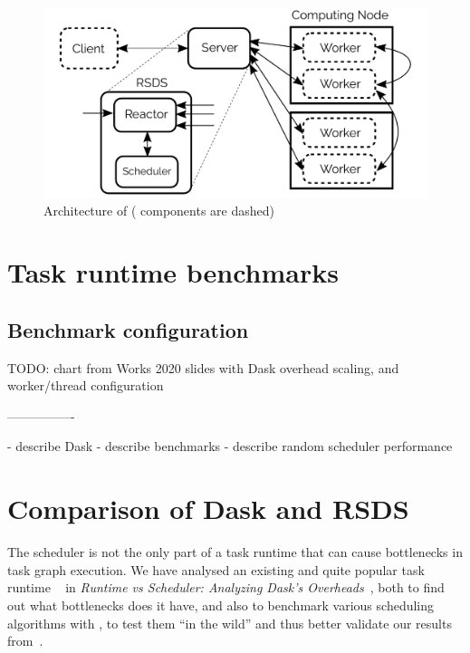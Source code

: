 \begin{figure}[tbph]
	\centering
	\includegraphics[width=0.8\linewidth]{./imgs/rsds/rsds-architecture}
	\caption{Architecture of \rsds{} (\dask{} components are dashed)}
	\label{fig:rsds-architecture}
\end{figure}

\section{Task runtime benchmarks}
\label{sec:rsds-dask-rsds-comparison}

\subsection*{Benchmark configuration}


TODO: chart from Works 2020 slides with Dask overhead scaling, and worker/thread configuration

----------------

- describe Dask
- describe benchmarks
- describe random scheduler performance


\section{Comparison of Dask and RSDS}
\label{sec:rsds-dask-comparison}

The scheduler is not the only part of a task runtime that can cause bottlenecks in task graph
execution. We have analysed an existing and quite popular task runtime
\dask{}~\cite{dask} in \emph{Runtime vs Scheduler: Analyzing Dask's Overheads}~\cite{rsds},
both to find out what bottlenecks does it have, and also to benchmark various scheduling algorithms
with \dask{}, to test them ``in the wild'' and thus better validate our results
from~\cite{estee}.

